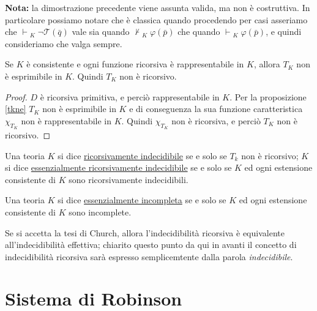 \textbf{Nota:} la dimostrazione precedente viene assunta valida, ma non è costruttiva. In
particolare possiamo notare che è classica quando procedendo per casi asseriamo che 
$\vdash \!\! _K \; \neg \mathcal{T}(\bar{q})$ vale sia quando $\nvdash \!\! _K \; \varphi(\bar{p})$
che quando $\vdash \!\! _K \; \varphi(\bar{p})$, e quindi consideriamo che valga sempre.


\begin{corol}
\label{tkkk}
Se $K$ è consistente e ogni funzione ricorsiva è rappresentabile in $K$, allora $T_K$ non è
esprimibile in $K$. Quindi $T_K$ non è ricorsivo.
\end{corol}

\begin{proof}
$D$ è ricorsiva primitiva, e perciò rappresentabile in $K$. Per la proposizione \ref{tkne} $T_K$
non è esprimibile in $K$ e di conseguenza la sua funzione caratteristica $\chi_{T_K}$ non è
rappresentabile in $K$. Quindi $\chi_{T_K}$ non è ricorsiva, e perciò $T_K$ non è ricorsivo. 
\end{proof}

\begin{defi}
Una teoria $K$ si dice \underline{ricorsivamente indecidibile} se e solo se $T_k$ non è ricorsivo; $K$ si dice \underline{essenzialmente ricorsivamente indecidibile} se e solo se $K$ 
ed ogni estensione consistente di $K$ sono ricorsivamente indecidibili.
\end{defi}

\begin{defi}
Una teoria $K$ si dice \underline{essenzialmente incompleta} se e solo se $K$ ed ogni estensione consistente
di $K$ sono incomplete.
\end{defi}


Se si accetta la tesi di Church, allora l'indecidibilità ricorsiva è equivalente all'indecidibilità
effettiva; chiarito questo punto da qui in avanti il concetto di indecidibilità 
ricorsiva sarà espresso semplicemtente
dalla parola \textit{indecidibile}.

\section{Sistema di Robinson}

